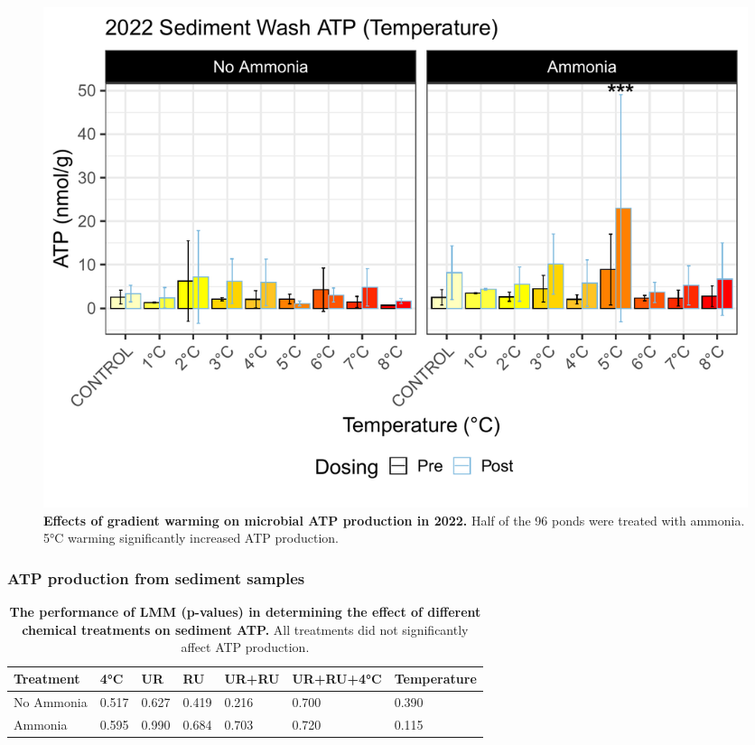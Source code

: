 \begin{figure}[H]
    \centering
    \includegraphics[scale=0.5]{./Figures/ATPSW2022_bar_temp}
    \caption{\textbf{Effects of gradient warming on microbial ATP production in 2022.} Half of the 96 ponds were treated with ammonia. 5°C warming significantly increased ATP production.}
    \label{fig:ATPSW2022_temp}
\end{figure}

\subsubsection{ATP production from sediment samples}

\begin{table}[H]
    \caption{{\bf The performance of LMM (p-values) in determining the effect of different chemical treatments on sediment ATP.} All treatments did not significantly affect ATP production. }
    \centering
    \begin{tabular}{ m{2.5cm}<{\centering}m{1.5cm}<{\centering}m{1.5cm}<{\centering}m{1.5cm}<{\centering}m{1.5cm}<{\centering}m{2.2cm}<{\centering}m{2.2cm}<{\centering}}
    \toprule
    Treatment & 4°C & UR & RU & UR+RU & UR+RU+4°C & Temperature \\
     \midrule
    No Ammonia & 0.517 & 0.627 & 0.419 & 0.216 & 0.700 & 0.390 \\
    Ammonia & 0.595 & 0.990 & 0.684 & 0.703 & 0.720 & 0.115 \\
    \bottomrule
    \end{tabular}    
    \label{tab:ATPS_treat}
\end{table}

